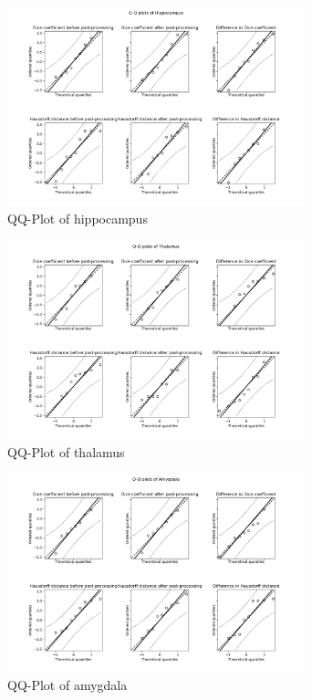 \documentclass[journal]{IEEEtran}
\begin{document}
\begin{figure}[ht]
\centering
\includegraphics[width=3.4in]{img/QQ_plots_PKF/Hippocampus.png}
\caption{QQ-Plot of hippocampus}
\label{fig_qq_h}
\end{figure}

\begin{figure}[ht]
\centering
\includegraphics[width=3.4in]{img/QQ_plots_PKF/Thalamus.png}
\caption{QQ-Plot of thalamus}
\label{fig_qq_t}
\end{figure}

\begin{figure}[ht]
\centering
\includegraphics[width=3.4in]{img/QQ_plots_PKF/Amygdala.png}
\caption{QQ-Plot of amygdala}
\label{fig_qq_a}
\end{figure}


\end{document}
